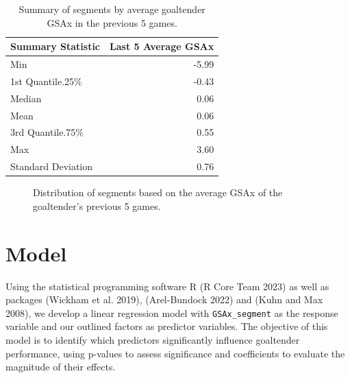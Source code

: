 \documentclass[
  letterpaper,
  DIV=11,
  numbers=noendperiod]{scrartcl}
\begin{document}
\begin{longtable}[]{@{}lr@{}}

\caption{\label{tbl-10}Summary of segments by average goaltender GSAx in
the previous 5 games.}

\tabularnewline

\toprule\noalign{}
Summary Statistic & Last 5 Average GSAx \\
\midrule\noalign{}
\endhead
\bottomrule\noalign{}
\endlastfoot
Min & -5.99 \\
1st Quantile.25\% & -0.43 \\
Median & 0.06 \\
Mean & 0.06 \\
3rd Quantile.75\% & 0.55 \\
Max & 3.60 \\
Standard Deviation & 0.76 \\

\end{longtable}

\begin{figure}


\caption{\label{fig-8}Distribution of segments based on the average GSAx
of the goaltender's previous 5 games.}

\end{figure}%

\newpage

\section{Model}\label{sec-model}

Using the statistical programming software R (R Core Team 2023) as well
as packages (Wickham et al. 2019), (Arel-Bundock 2022) and (Kuhn and Max
2008), we develop a linear regression model with \texttt{GSAx\_segment}
as the response variable and our outlined factors as predictor
variables. The objective of this model is to identify which predictors
significantly influence goaltender performance, using p-values to assess
significance and coefficients to evaluate the magnitude of their
effects.
\end{document}
